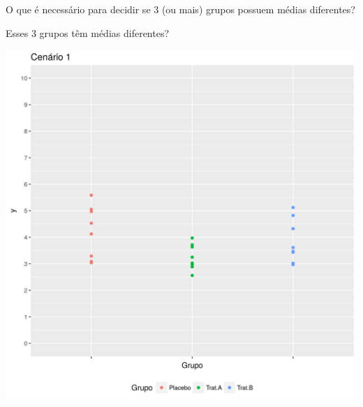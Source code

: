 \documentclass{beamer}
\begin{document}
\begin{frame}
  \begin{block}{}
    O que é necessário para decidir se 3 (ou mais) grupos possuem médias diferentes?
  \end{block}
\end{frame}

\begin{frame}{Esses 3 grupos têm médias diferentes?}
  \begin{center}
    \includegraphics[height=.9\textheight]{Cap13-30/cenario1}
  \end{center}
\end{frame}
\end{document}
